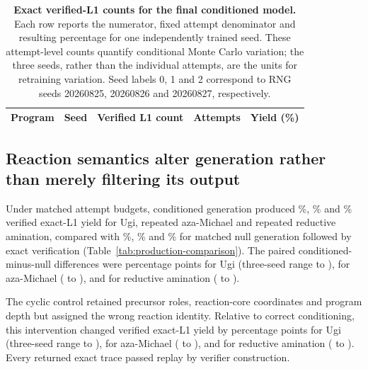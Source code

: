 \documentclass{article}
\begin{document}
\begin{table}[H]
\caption{\textbf{Exact verified-L1 counts for the final conditioned model.}
Each row reports the numerator, fixed attempt denominator and resulting percentage for one
independently trained seed. These attempt-level counts quantify conditional Monte Carlo variation;
the three seeds, rather than the individual attempts, are the units for retraining variation. Seed
labels 0, 1 and 2 correspond to RNG seeds 20260825, 20260826 and 20260827, respectively.}
\label{tab:production-seed-counts}
\centering
\small
\setlength{\tabcolsep}{7pt}
\begin{tabular}{lrrrr}
\hline
Program & Seed & Verified L1 count & Attempts & Yield (\%) \\
\hline
\end{tabular}
\end{table}

\subsection{Reaction semantics alter generation rather than merely filtering its output}

Under matched attempt budgets, conditioned generation produced
\ForgeTableOneConditionedUgiYield\%, \ForgeTableOneConditionedBLYield\% and
\ForgeTableOneConditionedLXYield\% verified exact-L1 yield for Ugi, repeated aza-Michael and
repeated reductive amination, compared with \ForgeTableOneNullUgiYield\%,
\ForgeTableOneNullBLYield\% and \ForgeTableOneNullLXYield\% for matched null generation followed
by exact verification
(Table~\ref{tab:production-comparison}).
The paired conditioned-minus-null differences were
\ForgeTableOneNullUgiDifferencePP{} percentage points for Ugi (three-seed range
\ForgeTableOneNullUgiRangeLowPP{} to \ForgeTableOneNullUgiRangeHighPP{}),
\ForgeTableOneNullBLDifferencePP{} for aza-Michael (\ForgeTableOneNullBLRangeLowPP{} to
\ForgeTableOneNullBLRangeHighPP{}), and \ForgeTableOneNullLXDifferencePP{} for reductive amination
(\ForgeTableOneNullLXRangeLowPP{} to \ForgeTableOneNullLXRangeHighPP{}).

The cyclic control retained precursor roles, reaction-core coordinates and program depth but assigned
the wrong reaction identity.
Relative to correct conditioning, this intervention changed verified exact-L1 yield by
\ForgeTableOneCyclicUgiDifferencePP{} percentage points for Ugi (three-seed range
\ForgeTableOneCyclicUgiRangeLowPP{} to \ForgeTableOneCyclicUgiRangeHighPP{}),
\ForgeTableOneCyclicBLDifferencePP{} for aza-Michael (\ForgeTableOneCyclicBLRangeLowPP{} to
\ForgeTableOneCyclicBLRangeHighPP{}), and \ForgeTableOneCyclicLXDifferencePP{} for reductive
amination (\ForgeTableOneCyclicLXRangeLowPP{} to \ForgeTableOneCyclicLXRangeHighPP{}). Every
returned exact trace passed replay by verifier construction.
\end{document}
